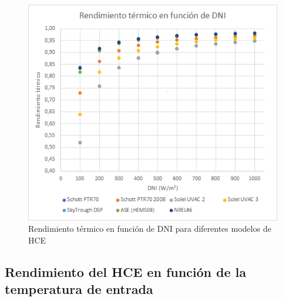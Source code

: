 \begin{figure}[!h]
\includegraphics[width=0.9\linewidth]{images/resultados_test1a.png}
\caption{Rendimiento térmico en función de DNI para diferentes modelos de HCE} 
\label{fig:test1a}
\end{figure}

\subsection{Rendimiento del HCE en función de la temperatura de entrada}

